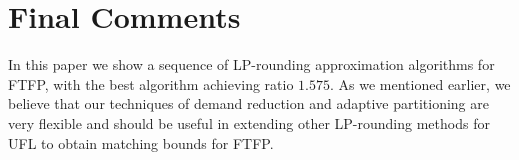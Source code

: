\documentclass[preprint,12pt]{elsarticle}
\begin{document}


















\section{Final Comments}

In this paper we show a sequence of LP-rounding approximation algorithms
for FTFP, with the best algorithm achieving  ratio $1.575$. 
As we mentioned earlier, we believe that 
our techniques of demand reduction and adaptive partitioning are very flexible and
should be useful in extending other LP-rounding methods for UFL to obtain
matching bounds for FTFP.
\end{document}
